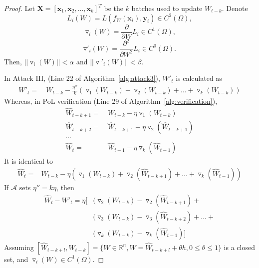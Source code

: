 \documentclass[conference]{IEEEtran}
\newcommand{\Adv}{\mathcal{A}\xspace}
\newcommand{\XX}{\mathbf{X}\xspace}
\newcommand{\xx}{\mathbf{x}\xspace}
\newcommand{\yy}{\mathbf{y}\xspace}
\begin{document}
\begin{proof}
Let $\XX=[\xx_1, \xx_2, ..., \xx_k]^T$ be the $k$ batches used to update $W_{t-k}$. 
Denote 
$$L_i(W) =L(f_W(\xx_i),\yy_i)\in C^2(\Omega),$$
$$\triangledown_i(W) = \frac{\partial}{\partial W}L_i\in C^1(\Omega),$$
$$\triangledown'_i(W) = \frac{\partial^2}{\partial W^2}L_i\in C^0(\Omega).$$
Then, $||\triangledown_i(W)||<\alpha$ and $||\triangledown'_i(W)||<\beta$.

In Attack III, (Line 22 of Algorithm~\ref{alg:attack3}), $W'_t$ is calculated as 
\begin{equation*}
    \begin{aligned}
    W'_t =&~W_{t-k}-\frac{\eta''}{k}(
       \triangledown_1(W_{t-k})+\triangledown_2(W_{t-k})+...+\triangledown_k(W_{t-k})
    )
    \end{aligned}
\end{equation*}
Whereas, in PoL verification (Line 29 of Algorithm~\ref{alg:verification}),
\begin{equation*}
    \begin{aligned}
    \hat{W}_{t-k+1} =&~W_{t-k}-\eta\triangledown_1(W_{t-k}) \\
    \hat{W}_{t-k+2} =&~\hat{W}_{t-k+1}-\eta\triangledown_2(\hat{W}_{t-k+1}) \\
    ...\\
    \hat{W}_t =&~\hat{W}_{t-1}-\eta\triangledown_k(\hat{W}_{t-1})
    \end{aligned}
\end{equation*}
It is identical to
\begin{equation*}
    \begin{aligned}
    \hat{W}_t = &W_{t-k}-\eta(
     \triangledown_1(W_{t-k})+\triangledown_2(\hat{W}_{t-k+1})+...+\triangledown_k(\hat{W}_{t-1})
       )
    \end{aligned}
\end{equation*}
If $\Adv$ sets $\eta'' = k\eta$, then
\begin{equation*}
    \begin{aligned}
       \hat{W}_t -W'_t = \eta[&(\triangledown_2(W_{t-k})-\triangledown_2(\hat{W}_{t-k+1})+\\&
       (\triangledown_3(W_{t-k})-\triangledown_3(\hat{W}_{t-k+2})+...+\\
       &(\triangledown_k(W_{t-k})-\triangledown_k(\hat{W}_{t-1})]
    \end{aligned}
\end{equation*}
Assuming $[\hat{W}_{t-k+l},W_{t-k}]=\{W\in \mathbb{R}^n,W=\hat{W}_{t-k+l}+\theta h,0\leq \theta \leq 1\}$ is a closed set, and $\triangledown_i(W)\in C^1(\Omega)$. 

\end{proof}
\end{document}
